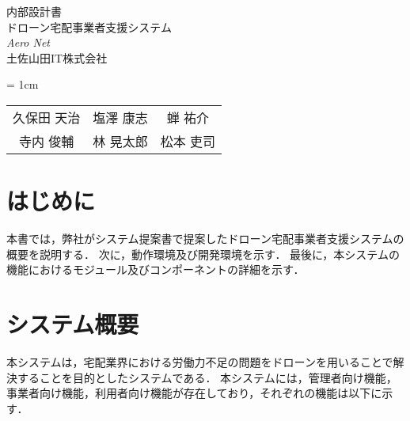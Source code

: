 \documentclass[a4paper, titlepage]{jsarticle}
\date{\today}
\newcommand{\system}{\textsl{Aero Net}}
\begin{document}
\begin{titlepage}
  \centering
  \vspace*{150truept}
  {\Large 内部設計書}\\
  \vspace*{50truept}
  {\Huge ドローン宅配事業者支援システム} \\
  \vspace{15truept}
  {\Huge \system} \\
  \vspace{50truept}
  {\LARGE 土佐山田IT株式会社}\\
  \vspace{20truept}
  {\large{\tabcolsep = 1cm
      \begin{tabular}{ccc}
        久保田 天治 & 塩澤 康志 & 蝉 祐介  \\
        寺内 俊輔  & 林 晃太郎 & 松本 吏司
      \end{tabular}
    }}
\end{titlepage}
\newcommand{\fig}[2]{
  \begin{figure}[H]
    \centering
    \texttt{[image: flow/\#1.pdf]}
    \caption{#2}
    \label{fig:#1}
  \end{figure}
  \clearpage
}
\newcommand{\ui}[2]{
  \begin{figure}[H]
    \centering
    \fbox{
      \texttt{[image: ui/\#1]}
      }
    \caption{#2}
    \label{fig:#1}
  \end{figure}
}

\tableofcontents

\clearpage

\section{はじめに}
本書では，弊社がシステム提案書で提案したドローン宅配事業者支援システムの概要を説明する．
次に，動作環境及び開発環境を示す．
最後に，本システムの機能におけるモジュール及びコンポーネントの詳細を示す．

\section{システム概要}
本システムは，宅配業界における労働力不足の問題をドローンを用いることで解決することを目的としたシステムである．
本システムには，管理者向け機能，事業者向け機能，利用者向け機能が存在しており，それぞれの機能は以下に示す．
\end{document}
